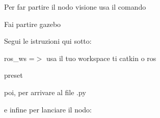 Per far partire il nodo visione usa il comando


\begin{DoxyEnumerate}
\item Fai partire gazebo
\item Segui le istruzioni qui sotto\+:
\end{DoxyEnumerate}

ros\+\_\+ws =$>$ usa il tuo workspace ti catkin o ros

preset 
\begin{DoxyCode}{0}
\end{DoxyCode}


poi, per arrivare al file .py 
\begin{DoxyCode}{0}
\end{DoxyCode}


e infine per lanciare il nodo\+: 
\begin{DoxyCode}{0}
\end{DoxyCode}
 